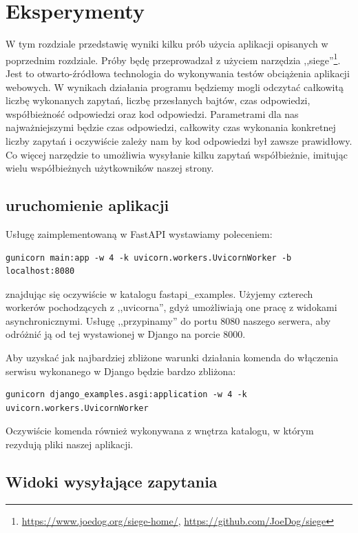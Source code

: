 \chapter{Eksperymenty}

W tym rozdziale przedstawię wyniki kilku prób użycia aplikacji opisanych w poprzednim rozdziale. Próby będę przeprowadzał z użyciem narzędzia ,,siege''\footnote{\url{https://www.joedog.org/siege-home/}, \url{https://github.com/JoeDog/siege}}. Jest to otwarto-źródłowa technologia do wykonywania testów obciążenia aplikacji webowych. W wynikach działania programu będziemy mogli odczytać całkowitą liczbę wykonanych zapytań, liczbę przesłanych bajtów, czas odpowiedzi, współbieżność odpowiedzi oraz kod odpowiedzi. Parametrami dla nas najważniejszymi będzie czas odpowiedzi, całkowity czas wykonania konkretnej liczby zapytań i oczywiście zależy nam by kod odpowiedzi był zawsze prawidłowy. Co więcej narzędzie to umożliwia wysyłanie kilku zapytań współbieżnie, imitując wielu współbieżnych użytkowników naszej strony.

\section{uruchomienie aplikacji}
Usługę zaimplementowaną w FastAPI wystawiamy poleceniem:
\begin{lstlisting}
gunicorn main:app -w 4 -k uvicorn.workers.UvicornWorker -b localhost:8080
\end{lstlisting}
znajdując się oczywiście w katalogu fastapi\_examples. Użyjemy czterech workerów pochodzących z ,,uvicorna'', gdyż umożliwiają one pracę z widokami asynchronicznymi. Usługę ,,przypinamy'' do portu 8080 naszego serwera, aby odróżnić ją od tej wystawionej w Django na porcie 8000.

Aby uzyskać jak najbardziej zbliżone warunki działania komenda do włączenia serwisu wykonanego w Django będzie bardzo zbliżona:
\begin{lstlisting}
gunicorn django_examples.asgi:application -w 4 -k uvicorn.workers.UvicornWorker
\end{lstlisting}
Oczywiście komenda również wykonywana z wnętrza katalogu, w którym rezydują pliki naszej aplikacji.

\section{Widoki wysyłające zapytania}
